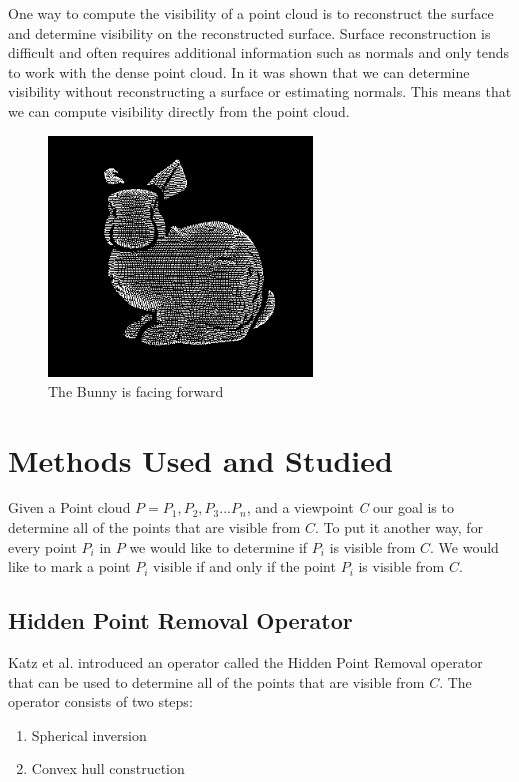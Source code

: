 \documentclass[11pt]{article}
\begin{document}
One way to compute the visibility of a point cloud is to reconstruct the surface and determine visibility on the reconstructed surface. Surface reconstruction is difficult and often requires additional information such as normals and only tends to work with the dense point cloud. In \cite{Katz07} it was shown that we can determine visibility without reconstructing a surface or estimating normals. This means that we can compute visibility directly from the point cloud. 

\begin{figure}[h]
\includegraphics[width=7cm]{bunny-facing-front}
\centering
\caption{The Bunny is facing forward}
\label{fig:bunny-facing-front}
\end{figure}

\pagebreak
\section{Methods Used and Studied}

Given a Point cloud $ P = P_{1},P_{2},P_{3} ... P_{n} $, and a viewpoint \emph{C} our goal is to determine all of the points that are visible from $C $. To put it another way, for every point $ P_{i} $ in $ P$ we would like to determine if $ P_{i} $ is visible from $ C$. We would like to mark a point $ P_{i} $ visible if and only if the point $ P_{i} $ is visible from $ C$.

\subsection{Hidden Point Removal Operator}
Katz et al. \cite{Katz07} introduced an operator called the Hidden Point Removal operator that can be used to determine all of the points that are visible from $C$. The operator consists of two steps:

\begin{enumerate}
\item Spherical inversion
\item Convex hull construction
\end{enumerate}
\end{document}
